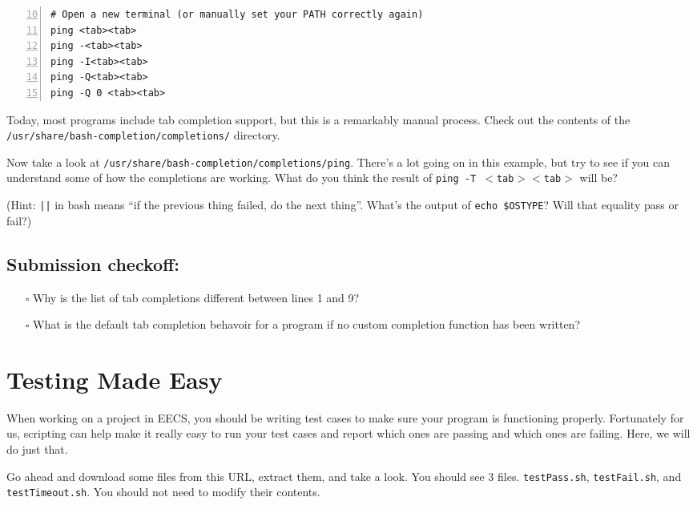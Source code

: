 \documentclass{article}
\begin{document}
\begin{lstlisting}[numbers=left,firstnumber=10]
# Open a new terminal (or manually set your PATH correctly again)
ping <tab><tab>
ping -<tab><tab>
ping -I<tab><tab>
ping -Q<tab><tab>
ping -Q 0 <tab><tab>
\end{lstlisting}

\noindent
Today, most programs include tab completion support, but this is a remarkably
manual process. Check out the contents of the
\texttt{/usr/share/bash-completion/completions/} directory.

\medskip
\noindent
Now take a look at \texttt{/usr/share/bash-completion/completions/ping}.
There's a lot going on in this example, but try to see if you can understand
some of how the completions are working. What do you think the result of
\texttt{ping~-T~$<$tab$><$tab$>$} will be?

\medskip
\noindent
(Hint: \texttt{||} in bash means ``if the previous thing failed, do the next
thing''. What's the output of \texttt{echo \$OSTYPE}? Will that equality pass
or fail?)


\subsection*{Submission checkoff:}
\begin{itemize}
  \item[$\square$] Why is the list of tab completions different between lines
    1 and 9?
  \item[$\square$] What is the default tab completion behavoir for a program
    if no custom completion function has been written?
\end{itemize}





\section{Testing Made Easy}

\medskip
\noindent
When working on a project in EECS, you should be writing test cases to make
sure your program is functioning properly. Fortunately
for us, scripting can help make it really easy to run your test cases and
report which ones are passing and which ones are failing. Here, we will do
just that.

\noindent
Go ahead and download some files from this URL, extract them, and take a look.
You should see 3 files. \texttt{testPass.sh}, \texttt{testFail.sh}, and
\texttt{testTimeout.sh}. You should not need to modify their contents.
\end{document}
